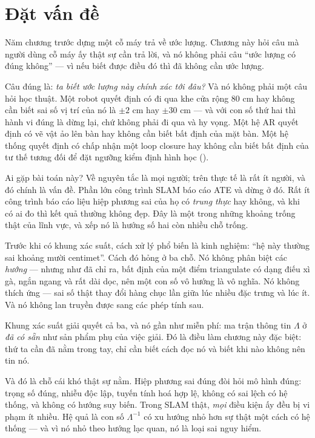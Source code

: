 \documentclass[../../vslam.tex]{subfiles}
\begin{document}
\section{Đặt vấn đề}

Năm chương trước dựng một cỗ máy trả về ước lượng. Chương này hỏi câu mà người dùng cỗ máy ấy thật sự cần trả lời, và nó không phải câu ``ước lượng có đúng không'' --- vì nếu biết được điều đó thì đã không cần ước lượng.

Câu đúng là: \emph{ta biết ước lượng này chính xác tới đâu?} Và nó không phải một câu hỏi học thuật. Một robot quyết định có đi qua khe cửa rộng \(80\) cm hay không cần biết sai số vị trí của nó là \(\pm 2\) cm hay \(\pm 30\) cm --- và với con số thứ hai thì hành vi đúng là dừng lại, chứ không phải đi qua và hy vọng. Một hệ AR quyết định có vẽ vật ảo lên bàn hay không cần biết bất định của mặt bàn. Một hệ thống quyết định có chấp nhận một loop closure hay không cần biết bất định của tư thế tương đối để đặt ngưỡng kiểm định hình học ().

Ai gặp bài toán này? Về nguyên tắc là mọi người; trên thực tế là rất ít người, và đó chính là vấn đề. Phần lớn công trình SLAM báo cáo ATE và dừng ở đó. Rất ít công trình báo cáo liệu hiệp phương sai của họ có \emph{trung thực} hay không, và khi có ai đo thì kết quả thường không đẹp. Đây là một trong những khoảng trống thật của lĩnh vực, và  xếp nó là hướng số hai còn nhiều chỗ trống.

Trước khi có khung xác suất, cách xử lý phổ biến là kinh nghiệm: ``hệ này thường sai khoảng mười centimet''. Cách đó hỏng ở ba chỗ. Nó không phân biệt các \emph{hướng} --- nhưng như  đã chỉ ra, bất định của một điểm triangulate có dạng điếu xì gà, ngắn ngang và rất dài dọc, nên một con số vô hướng là vô nghĩa. Nó không thích ứng --- sai số thật thay đổi hàng chục lần giữa lúc nhiều đặc trưng và lúc ít. Và nó không lan truyền được sang các phép tính sau.

Khung xác suất giải quyết cả ba, và nó gần như miễn phí: ma trận thông tin \(\Lambda\) ở  \emph{đã có sẵn} như sản phẩm phụ của việc giải. Đó là điều làm chương này đặc biệt: thứ ta cần đã nằm trong tay, chỉ cần biết cách đọc nó và biết khi nào không nên tin nó.

Và đó là chỗ cái khó thật sự nằm. Hiệp phương sai đúng đòi hỏi mô hình đúng: trọng số đúng, nhiễu độc lập, tuyến tính hoá hợp lệ, không có sai lệch có hệ thống, và không có hướng suy biến. Trong SLAM thật, \emph{mọi} điều kiện ấy đều bị vi phạm ít nhiều. Hệ quả là con số \(\Lambda^{-1}\) có xu hướng nhỏ hơn sự thật một cách có hệ thống --- và vì nó nhỏ theo hướng lạc quan, nó là loại sai nguy hiểm.
\end{document}
